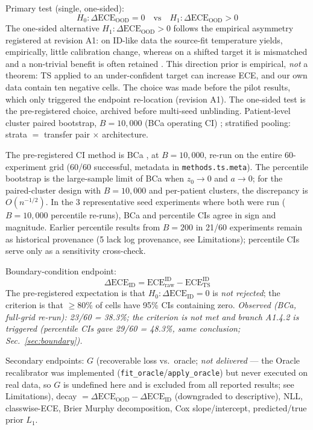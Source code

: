 \documentclass[review,12pt,nonatbib]{elsarticle}
\begin{document}
Primary test (single, one-sided):
\begin{equation}
    H_0: \Delta\text{ECE}_{\text{OOD}} = 0
    \quad\text{vs}\quad
    H_1: \Delta\text{ECE}_{\text{OOD}} > 0
\end{equation}
The one-sided alternative
$H_1: \Delta\text{ECE}_{\text{OOD}} > 0$ follows the empirical
asymmetry registered at revision A1: on ID-like data the source-fit
temperature yields, empirically, little calibration change, whereas
on a shifted target it is mismatched and a non-trivial benefit is
often retained \cite{guo2017calibration,ovadia2019calibration}. This
direction prior is empirical, \emph{not} a theorem: TS applied to an
under-confident target can increase ECE, and our own data contain
ten negative cells. The choice was made before the pilot results,
which only triggered the endpoint re-location (revision A1). The
one-sided test is the pre-registered choice, archived before
multi-seed unblinding.
Patient-level cluster paired bootstrap, $B=10{,}000$ (BCa
operating CI) \cite{efron1987bca}; stratified pooling: strata $=$ transfer pair
$\times$ architecture.

The pre-registered
CI method is BCa \cite{efron1987bca}, at $B=10{,}000$,
re-run on the entire 60-experiment grid (60/60 successful, metadata
in \texttt{methods.ts.meta}). The percentile bootstrap is the
large-sample limit of BCa when $z_0\to 0$ and $a\to 0$; for the
paired-cluster design with $B=10{,}000$ and per-patient clusters,
the discrepancy is $O(n^{-1/2})$. In the 3 representative seed
experiments where both were run ($B=10{,}000$ percentile re-runs),
BCa and percentile CIs agree in sign and magnitude. Earlier
percentile results from $B=200$ in 21/60 experiments remain as
historical provenance (5 lack log provenance, see Limitations);
percentile CIs serve only as a sensitivity cross-check.

Boundary-condition endpoint:
\begin{equation}
    \Delta\text{ECE}_{\text{ID}}
    = \text{ECE}_{\mathrm{raw}}^{\mathrm{ID}} - \text{ECE}_{\mathrm{TS}}^{\mathrm{ID}}
\end{equation}
The pre-registered expectation is that $H_0: \Delta\text{ECE}_{\text{ID}} = 0$ is \emph{not rejected};
the criterion is that $\geq 80\%$ of cells have 95\% CIs containing zero.
\emph{Observed (BCa, full-grid re-run): 23/60 = 38.3\%; the criterion is
not met and branch A1.4.2 is triggered (percentile CIs gave 29/60 =
48.3\%, same conclusion; Sec.~\ref{sec:boundary}).}

Secondary endpoints: $G$ (recoverable loss vs.\ oracle; \emph{not
delivered} --- the Oracle recalibrator was implemented
(\texttt{fit\_oracle}/\texttt{apply\_oracle}) but never executed on real
data, so $G$ is undefined here and is excluded from all reported
results; see Limitations), decay
$=\Delta\text{ECE}_{\text{OOD}}-\Delta\text{ECE}_{\text{ID}}$
(downgraded to descriptive), NLL, classwise-ECE, Brier Murphy
decomposition, Cox slope/intercept, predicted/true prior $L_1$.
\end{document}

